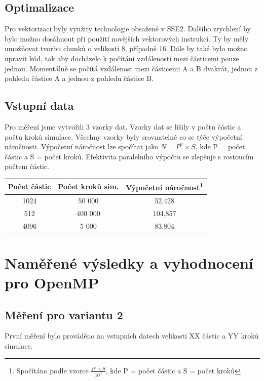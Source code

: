 \documentclass[12pt]{article}
\begin{document}
\subsection{Optimalizace}

Pro vektorizaci byly využity technologie obsažené v SSE2. Dalšího zrychlení by bylo možno dosáhnout při použití novějších vektorových instrukcí.
Ty by měly umožňovat tvorbu chunků o velikosti 8, případně 16.
Dále by také bylo možno upravit kód, tak aby docházelo k počítání vzdálenosti mezi částicemi pouze jednou.
Momentálně se počítá vzdálenost mezi částicemi A a B dvakrát, jednou z pohledu částice A a jednou z pohledu částice B.

\subsection{Vstupní data}

Pro měření jsme vytvořili 3 vzorky dat. Vzorky dat se lišily v počtu částic a počtu kroků simulace.
Všechny vzorky byly srovnatelné co se týče výpočetní náročnosti. Výpočetní náročnost lze spočítat jako ${N = P^2 \times S}$, kde P = počet částic a S = počet kroků.
Efektivita paralelního výpočtu se zlepšuje s rostoucím počtem částic.

\begin{center}
\begin{tabular}{c | c | c }
\textbf{Počet částic} & \textbf{Počet kroků sim.}  & \textbf{Výpočetní náročnost}\footnote{Spočítáno podle vzorce ${\frac{P^2 \times S}{10^9}}$, kde P = počet částic a S = počet kroků} \\ \hline \hline
1024 & 50 000 & 52,428 \\ \hline
512 & 400 000 & 104,857 \\ \hline
4096 & 5 000 & 83,804 \\ \hline
\end{tabular}
\end{center}

\section{Naměřené výsledky a vyhod\-noce\-ní pro O\-pen\-MP}

\subsection{Měření pro variantu 2}
První měření bylo prováděno na vstupních datech velikosti XX částic a YY kroků simulace.
\end{document}
